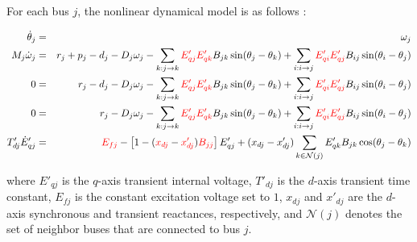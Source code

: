 \documentclass[journal,12pt,onecolumn,draftclsnofoot]{IEEEtran}
\begin{document}
\IEEEpeerreviewmaketitle
For each bus $j$, the nonlinear dynamical model is as follows \cite{wang2017distributed,stegink2017unifying,stegink2016stabilization}:
\begin{small}
\begin{eqnarray*}
\dot \theta_j & = & \omega_j   \\
M_j \dot \omega_j & = & r_j+p_j-d_j - D_j \omega_j -\sum_{k:j\rightarrow k}  {\color{red}   E'_{qj} E'_{qk}    }   B_{jk} \sin (\theta_j-\theta_k) +\sum_{i:i\rightarrow j}   {\color{red}   E'_{qi} E'_{qj}       }    B_{ij} \sin (\theta_i-\theta_j)   \\
0 & = & r_j-d_j - D_j \omega_j -\sum_{k:j\rightarrow k}  {\color{red}   E'_{qj} E'_{qk}    }   B_{jk} \sin (\theta_j-\theta_k) +\sum_{i:i\rightarrow j}   {\color{red}   E'_{qi} E'_{qj}       }    B_{ij} \sin (\theta_i-\theta_j)   \\
0 & = & r_j- D_j \omega_j -\sum_{k:j\rightarrow k}  {\color{red}   E'_{qj} E'_{qk}    }   B_{jk} \sin (\theta_j-\theta_k) +\sum_{i:i\rightarrow j}   {\color{red}   E'_{qi} E'_{qj}       }    B_{ij} \sin (\theta_i-\theta_j)   \\
T'_{dj}    \dot E'_{qj} & = &  {\color{red}  E_{fj}   }  -  \left[1-({\color{red} x_{dj}}- {\color{red}x'_{dj}}) {\color{red} B_{jj}  } \right] E'_{qj}  +  (x_{dj}-x'_{dj})    \sum_{k\in \mathcal{N}(j)}  E'_{qk} B_{jk} \cos (\theta_j-\theta_k)   
\end{eqnarray*}	\end{small}%
where $E'_{qj}$ is the $q$-axis transient internal voltage, $T'_{dj}$ is the $d$-axis transient time constant, $E_{fj}$ is the constant excitation voltage set to $1$, $x_{dj}$ and $x'_{dj}$ are the $d$-axis synchronous and transient reactances, respectively, and $\mathcal{N}(j)$ denotes the set of neighbor buses that are connected to bus $j$.  











  
  
\end{document}

